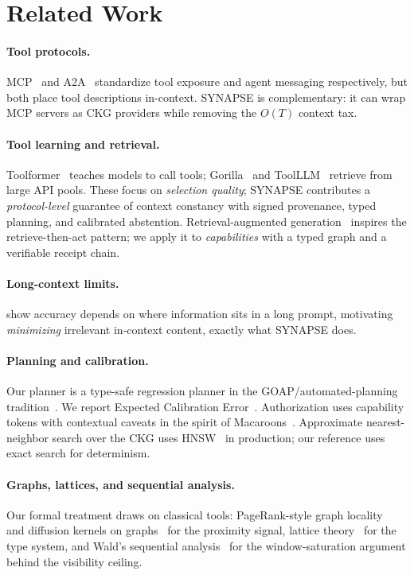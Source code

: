 \documentclass[11pt]{article}
\theoremstyle{plain}
\theoremstyle{definition}
\begin{document}
\section{Related Work}
\paragraph{Tool protocols.} MCP~\citep{mcp2024} and A2A~\citep{a2a2024}
standardize tool exposure and agent messaging respectively, but both place tool
descriptions in-context. SYNAPSE is complementary: it can wrap MCP servers as
CKG providers while removing the $O(T)$ context tax.

\paragraph{Tool learning and retrieval.} Toolformer~\citep{schick2023toolformer}
teaches models to call tools; Gorilla~\citep{patil2023gorilla} and
ToolLLM~\citep{qin2024toolllm} retrieve from large API pools. These focus on
\emph{selection quality}; SYNAPSE contributes a \emph{protocol-level} guarantee
of context constancy with signed provenance, typed planning, and calibrated
abstention. Retrieval-augmented generation~\citep{lewis2020rag} inspires the
retrieve-then-act pattern; we apply it to \emph{capabilities} with a typed graph
and a verifiable receipt chain.

\paragraph{Long-context limits.} \citet{liu2024lostmiddle} show accuracy depends
on where information sits in a long prompt, motivating \emph{minimizing}
irrelevant in-context content, exactly what SYNAPSE does.

\paragraph{Planning and calibration.} Our planner is a type-safe regression
planner in the GOAP/automated-planning tradition~\citep{ghallab2004automated}.
We report Expected Calibration Error~\citep{guo2017calibration}. Authorization
uses capability tokens with contextual caveats in the spirit of
Macaroons~\citep{birgersson2016macaroons}. Approximate nearest-neighbor search
over the CKG uses HNSW~\citep{malkov2018hnsw} in production; our reference uses
exact search for determinism.

\paragraph{Graphs, lattices, and sequential analysis.} Our formal treatment
draws on classical tools: PageRank-style graph locality~\citep{page1999pagerank}
and diffusion kernels on graphs~\citep{kondor2002diffusion} for the proximity
signal, lattice theory~\citep{davey2002lattices} for the type system, and Wald's
sequential analysis~\citep{wald1947sequential} for the window-saturation
argument behind the visibility ceiling.
\end{document}
